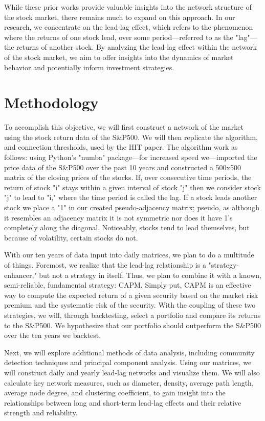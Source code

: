 \documentclass{article}
\begin{document}
While these prior works provide valuable insights into the network structure of the stock market, there remains much to expand on this approach. In our research, we concentrate on the lead-lag effect, which refers to the phenomenon where the returns of one stock lead, over some period—referred to as the "lag"—the returns of another stock. By analyzing the lead-lag effect within the network of the stock market, we aim to offer insights into the dynamics of  market behavior and potentially inform investment strategies.
\section{Methodology}
To accomplish this objective, we will first construct a network of the market using the stock return data of the S\&P500.  We will then replicate the algorithm, and connection thresholds, used by the HIT paper. The algorithm work as follows: using Python's "numba" package—for increased speed we—imported the price data of the S\&P500 over the past 10 years and constructed a 500x500 matrix of the closing prices of the stocks. If, over consecutive time periods, the return of stock "i" stays within a given interval of stock "j" then we consider stock "j" to lead to "i," where the time period is called the lag. If a stock leads another stock we place a "1" in our created pseudo-adjacency matrix; pseudo, as although it resembles an adjacency matrix it is not symmetric nor does it have 1's completely along the diagonal. Noticeably, stocks tend to lead themselves, but because of volatility, certain stocks do not. 

With our ten years of data input into daily matrices, we plan to do a multitude of things.  Foremost, we realize that the lead-lag relationship is a "strategy-enhancer," but not a strategy in itself. Thus, we plan to combine it with a known, semi-reliable, fundamental strategy: CAPM. Simply put, CAPM is an effective way to compute the expected return of a given security based on the market risk premium and the systematic risk of the security. With the coupling of these two strategies, we will, through backtesting, select a portfolio and compare its returns to the S\&P500. We hypothesize that our portfolio should outperform the S\&P500 over the ten years we backtest.

Next, we will explore additional methods of data analysis, including community detection techniques and principal component analysis. Using our matrices, we will construct daily and yearly lead-lag networks and visualize them. We will also calculate key network measures, such as diameter, density, average path length, average node degree, and clustering coefficient, to gain insight into the relationships between long and short-term lead-lag effects and their relative strength and reliability.
\end{document}
